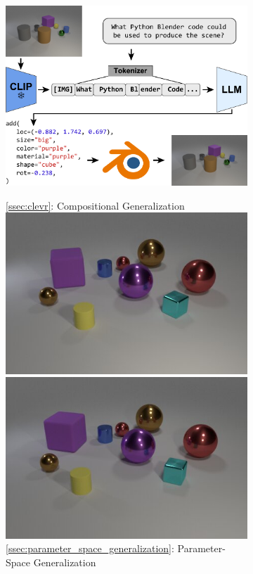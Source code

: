 \begin{figure}
\begin{subfigure}{0.655\textwidth}
\centering
\includegraphics[width=\linewidth]{figures/diagram/pipeline.pdf}
\end{subfigure}
\hfill
\vline
\hfill
\begin{subfigure}{0.325\textwidth}
\centering
\small
\cref{ssec:clevr}: Compositional Generalization\\
\vspace{0.025cm}
\includegraphics[width=0.400\linewidth]{figures/clevr/input/teaser.jpg}
\hspace{0.025cm}
\raisebox{0.25in}{$\Rightarrow$}
\hspace{0.025cm}
\includegraphics[width=0.400\linewidth]{figures/clevr/output/teaser.jpg}\\
\cref{ssec:parameter_space_generalization}: Parameter-Space Generalization\\

\end{subfigure}
\end{figure}
